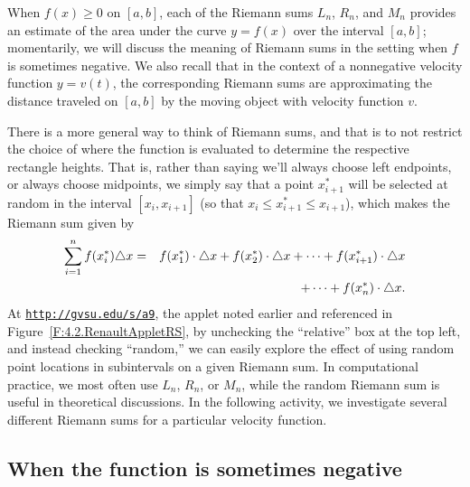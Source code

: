 
When $f(x) \ge 0$ on $[a,b]$, each of the Riemann sums $L_n$, $R_n$, and $M_n$ provides an estimate of the area under the curve $y = f(x)$ over the interval $[a,b]$; momentarily, we will discuss the meaning of Riemann sums in the setting when $f$ is sometimes negative.  We also recall that in the context of a nonnegative velocity function $y = v(t)$, the corresponding Riemann sums are approximating the distance traveled on $[a,b]$ by the moving object with velocity function $v$.

There is a more general way to think of Riemann sums, and that is to not restrict the choice of where the function is evaluated to determine the respective rectangle heights.  That is, rather than saying we'll always choose left endpoints, or always choose midpoints, we simply say that a point $x_{i+1}^*$ will be selected at random in the interval $[x_i, x_{i+1}]$ (so that $x_i \le x_{i+1}^* \le x_{i+1}$), which makes the Riemann sum given by
\begin{eqnarray*}
\displaystyle \sum_{i=1}^{n} f(x_i^*) \triangle x & = & f(x_1^*) \cdot \triangle x + f(x_2^*) \cdot \triangle x + \cdots + f(x_{i+1}^*) \cdot \triangle x \\
& & + \cdots + f(x_n^*) \cdot \triangle x.
\end{eqnarray*}
At \href{http://gvsu.edu/s/a9}{\texttt{http://gvsu.edu/s/a9}}, the applet noted earlier and referenced in Figure~\ref{F:4.2.RenaultAppletRS}, by unchecking the ``relative'' box at the top left, and instead checking ``random,'' we can easily explore the effect of using random point locations in subintervals on a given Riemann sum.  In computational practice, we most often use $L_n$, $R_n$, or $M_n$, while the random Riemann sum is useful in theoretical discussions.  In the following activity, we investigate several different Riemann sums for a particular velocity function.



\subsection*{When the function is sometimes negative}

